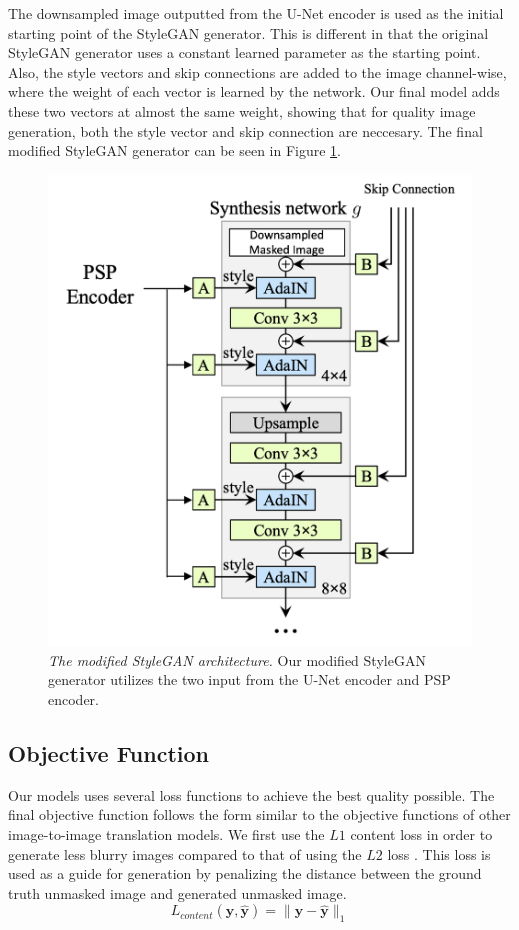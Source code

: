 \documentclass[sigconf,authorversion,nonacm]{acmart}
\begin{document}
The downsampled image outputted from the U-Net encoder is used as the initial starting point of the StyleGAN generator. This is different in that the original StyleGAN generator uses a constant learned parameter as the starting point. Also, the style vectors and skip connections are added to the
image channel-wise, where the weight of each vector is learned by the network. Our final model
adds these two vectors at almost the same weight, showing that for quality image generation, both
the style vector and skip connection are neccesary.
The final modified StyleGAN generator can be seen in Figure \ref{images:modified-stylegan}.

\begin{figure}
  \centering
  \includegraphics[width=0.8\linewidth]{images/modified-stylegan.png}
  \caption{\emph{The modified StyleGAN architecture.} Our modified StyleGAN generator utilizes the two input from the U-Net encoder and PSP encoder.}
  \label{images:modified-stylegan}
\end{figure}

\subsection{Objective Function}
Our models uses several loss functions to achieve the best quality possible. The final
objective function follows the form similar to the objective functions of other image-to-image
translation models.
We first use the $L1$ content loss in order to generate less blurry images
compared to that of using the $L2$ loss \cite{L1, Pix2Pix}. This loss is used as a
guide for generation by penalizing the distance between the ground truth unmasked image and
generated unmasked image.
\[
    L_{content}(\mathbf{y}, \mathbf{\hat{y}}) = \|\mathbf{y} - \mathbf{\hat{y}}\|_1
\]
\end{document}
